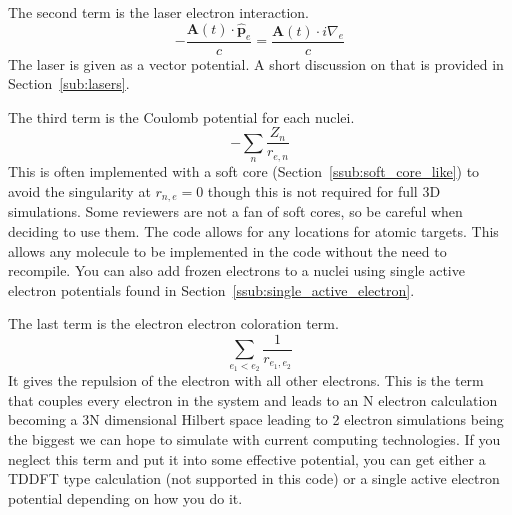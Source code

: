 \documentclass{article}
\begin{document}
The second term is the laser electron interaction.
\begin{equation}
  - \frac{\mathbf{A}(t) \cdot \hat{\mathbf{p}}_e}{c} = \frac{\mathbf{A}(t) \cdot i\nabla_e}{c}
\end{equation}
The laser is given as a vector potential. A short discussion on that is provided in Section~\ref{sub:lasers}.

The third term is the Coulomb potential for each nuclei.
\begin{equation}
  - \sum_{n} \frac{Z_n}{r_{e,n}}
\end{equation}
This is often implemented with a soft core (Section~\ref{ssub:soft_core_like}) to avoid the singularity at $r_{n,e}=0$ though this is not required for full 3D simulations. Some reviewers are not a fan of soft cores, so be careful when deciding to use them. The code allows for any locations for atomic targets. This allows any molecule to be implemented in the code without the need to recompile. You can also add frozen electrons to a nuclei using single active electron potentials found in Section~\ref{ssub:single_active_electron}.

The last term is the electron electron coloration term.
\begin{equation}
  \sum_{e_1 < e_2}\frac{1}{r_{e_1, e_2}}
\end{equation}
It gives the repulsion of the electron with all other electrons. This is the term that couples every electron in the system and leads to an N electron calculation becoming a 3N dimensional Hilbert space leading to 2 electron simulations being the biggest we can hope to simulate with current computing technologies. If you neglect this term and put it into some effective potential, you can get either a TDDFT type calculation (not supported in this code) or a single active electron potential depending on how you do it.
\end{document}
